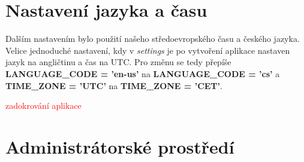 \section{Nastavení jazyka a času}

Dalším nastavením bylo použití našeho středoevropského času a českého jazyka. Velice jednoduché nastavení, kdy v \emph{settings} je po vytvoření aplikace nastaven jazyk na angličtinu a čas na UTC. Pro změnu se tedy přepíše \textbf{LANGUAGE\_CODE = 'en-us'} na \textbf{LANGUAGE\_CODE = 'cs'} a \textbf{TIME\_ZONE = 'UTC'} na \textbf{TIME\_ZONE = 'CET'}.


\textcolor{red}{zadokrování aplikace} 

\section{Administrátorské prostředí}



















